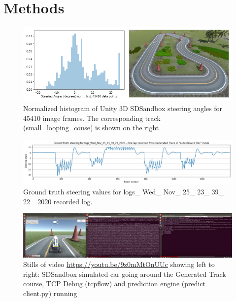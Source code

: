 \section{Methods}




\begin{figure}[htbp]
  \centering
  \includegraphics[width=\textwidth]{Figures/GeneratedTrackPlusHistogram.png}
 \caption{
 Normalized histogram of Unity 3D SDSandbox steering angles for 45410 image frames. The corresponding track (small\_looping\_couse) is shown on the right
 }
 \label{fig:GeneratedTrackPlusHist}
\end{figure}

\begin{figure}[htbp]
 \centering 
 \includegraphics[width=\textwidth]{Figures/genTrackOneLap_logs_Wed_Nov_25_23_39_22_2020_ground_truth_steering_angles.png}
 \caption{Ground truth steering values for logs\_ Wed\_ Nov\_ 25\_ 23\_ 39\_ 22\_ 2020 recorded log.}
 \label{fig:genTrackOneLap_logs_Wed_Nov_25_23_39_22_2020_ground_truth_steering_angles} 
\end{figure}

\begin{figure}[htbp]
\centering
\includegraphics[width=\textwidth]{Figures/SimTCPPred.png}
\caption{Stills of video \url{https://youtu.be/9z0mMtOnUUc} showing left to right: SDSandbox simulated car going around the Generated Track course, TCP Debug (tcpflow) and prediction engine (predict\_ client.py) running}
\label{fig:SimTCPPred}
\end{figure}

